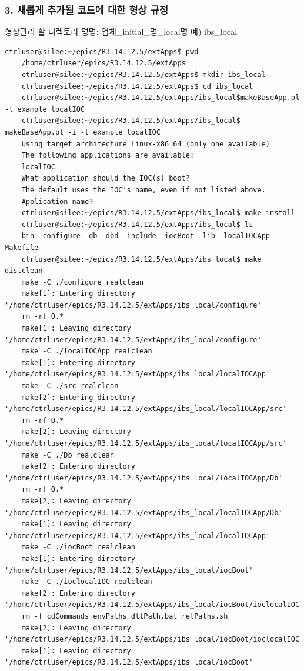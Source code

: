\documentclass[11pt
  , a4paper
  , article
  , oneside
]{memoir}
\begin{document}
    
\subsubsection {3. 새롭게 추가될 코드에 대한 형상 규정}
	형상관리 할 디렉토리 명명: 업체\_initial\_명\_local명 예) ibs\_local
	\begin{lstlisting}[style=termstyle, escapechar=!]
	ctrluser@silee:~/epics/R3.14.12.5/extApps$ pwd
	/home/ctrluser/epics/R3.14.12.5/extApps
	ctrluser@silee:~/epics/R3.14.12.5/extApps$ mkdir ibs_local
	ctrluser@silee:~/epics/R3.14.12.5/extApps$ cd ibs_local
	ctrluser@silee:~/epics/R3.14.12.5/extApps/ibs_local$makeBaseApp.pl -t example localIOC
	ctrluser@silee:~/epics/R3.14.12.5/extApps/ibs_local$ makeBaseApp.pl -i -t example localIOC
	Using target architecture linux-x86_64 (only one available)
	The following applications are available:
	localIOC
	What application should the IOC(s) boot?
	The default uses the IOC's name, even if not listed above.
	Application name? 
	ctrluser@silee:~/epics/R3.14.12.5/extApps/ibs_local$ make install
	ctrluser@silee:~/epics/R3.14.12.5/extApps/ibs_local$ ls
	bin  configure  db  dbd  include  iocBoot  lib  localIOCApp  Makefile
	ctrluser@silee:~/epics/R3.14.12.5/extApps/ibs_local$ make distclean
	make -C ./configure realclean 
	make[1]: Entering directory '/home/ctrluser/epics/R3.14.12.5/extApps/ibs_local/configure'
	rm -rf O.*
	make[1]: Leaving directory '/home/ctrluser/epics/R3.14.12.5/extApps/ibs_local/configure'
	make -C ./localIOCApp realclean 
	make[1]: Entering directory '/home/ctrluser/epics/R3.14.12.5/extApps/ibs_local/localIOCApp'
	make -C ./src realclean 
	make[2]: Entering directory '/home/ctrluser/epics/R3.14.12.5/extApps/ibs_local/localIOCApp/src'
	rm -rf O.*
	make[2]: Leaving directory '/home/ctrluser/epics/R3.14.12.5/extApps/ibs_local/localIOCApp/src'
	make -C ./Db realclean 
	make[2]: Entering directory '/home/ctrluser/epics/R3.14.12.5/extApps/ibs_local/localIOCApp/Db'
	rm -rf O.*
	make[2]: Leaving directory '/home/ctrluser/epics/R3.14.12.5/extApps/ibs_local/localIOCApp/Db'
	make[1]: Leaving directory '/home/ctrluser/epics/R3.14.12.5/extApps/ibs_local/localIOCApp'
	make -C ./iocBoot realclean 
	make[1]: Entering directory '/home/ctrluser/epics/R3.14.12.5/extApps/ibs_local/iocBoot'
	make -C ./ioclocalIOC realclean 
	make[2]: Entering directory '/home/ctrluser/epics/R3.14.12.5/extApps/ibs_local/iocBoot/ioclocalIOC'
	rm -f cdCommands envPaths dllPath.bat relPaths.sh
	make[2]: Leaving directory '/home/ctrluser/epics/R3.14.12.5/extApps/ibs_local/iocBoot/ioclocalIOC'
	make[1]: Leaving directory '/home/ctrluser/epics/R3.14.12.5/extApps/ibs_local/iocBoot'

\end{lstlisting}
\end{document}
